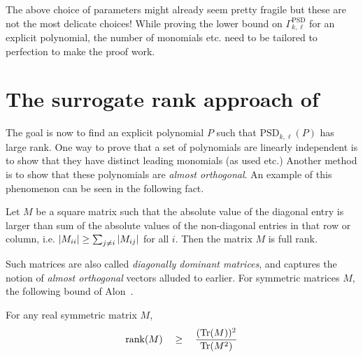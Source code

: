 The above choice of parameters might already seem pretty fragile but these are not the most delicate choices! While proving the lower bound on $\Gamma^{\mathrm{PSD}}_{k,\ell}$ for an explicit polynomial, the number of monomials etc. need to be tailored to perfection to make the proof work. 

\section{The surrogate rank approach of \cite{KLSS}}

The goal is now to find an explicit polynomial $P$ such that $\mathrm{PSD}_{k,\ell}(P)$ has large rank. One way to prove that a set of polynomials are linearly independent is to show that they have distinct leading monomials (as used \cite{gkks13} etc.) Another method is to show that these polynomials are \emph{almost orthogonal}. An example of this phenomenon can be seen in the following fact. 

\begin{fact}
Let $M$ be a square matrix such that the absolute value of the diagonal entry is larger than sum of the absolute values of the non-diagonal entries in that row or column, i.e. $\left|M_{ii}\right| \geq \sum_{j\neq i} \left|M_{ij}\right|$ for all $i$. Then the matrix $M$ is full rank. 
\end{fact}

Such matrices are also called \emph{diagonally dominant matrices}, and captures the notion of \emph{almost orthogonal} vectors alluded to earlier. For symmetric matrices $M$, the following bound of Alon~\cite{Alo09}.

\begin{lemma}\label{lem:trace-bound} For any real symmetric matrix $M$, 
\[
\mathrm{rank}(M) \quad \geq \quad \frac{(\mathrm{Tr}(M))^2}{\mathrm{Tr}(M^2)}
\]
\end{lemma}

